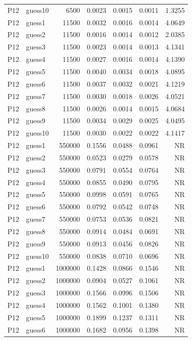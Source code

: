 {\begin{longtable}{llrrrrr}
P12 & guess10 & 6500 & 0.0023 & 0.0015 & 0.0011 & 1.3255 \\
P12 & guess1 & 11500 & 0.0032 & 0.0016 & 0.0014 & 4.0649 \\
P12 & guess2 & 11500 & 0.0016 & 0.0014 & 0.0012 & 2.0385 \\
P12 & guess3 & 11500 & 0.0023 & 0.0014 & 0.0013 & 4.1341 \\
P12 & guess4 & 11500 & 0.0027 & 0.0016 & 0.0014 & 4.1390 \\
P12 & guess5 & 11500 & 0.0040 & 0.0034 & 0.0018 & 4.0895 \\
P12 & guess6 & 11500 & 0.0037 & 0.0032 & 0.0021 & 4.1219 \\
P12 & guess7 & 11500 & 0.0030 & 0.0018 & 0.0026 & 4.0521 \\
P12 & guess8 & 11500 & 0.0026 & 0.0014 & 0.0015 & 4.0684 \\
P12 & guess9 & 11500 & 0.0034 & 0.0029 & 0.0025 & 4.0495 \\
P12 & guess10 & 11500 & 0.0030 & 0.0022 & 0.0022 & 4.1417 \\
P12 & guess1 & 550000 & 0.1556 & 0.0488 & 0.0961 & NR \\
P12 & guess2 & 550000 & 0.0523 & 0.0279 & 0.0578 & NR \\
P12 & guess3 & 550000 & 0.0791 & 0.0554 & 0.0764 & NR \\
P12 & guess4 & 550000 & 0.0855 & 0.0490 & 0.0795 & NR \\
P12 & guess5 & 550000 & 0.0998 & 0.0591 & 0.0765 & NR \\
P12 & guess6 & 550000 & 0.0792 & 0.0542 & 0.0748 & NR \\
P12 & guess7 & 550000 & 0.0753 & 0.0536 & 0.0821 & NR \\
P12 & guess8 & 550000 & 0.0914 & 0.0484 & 0.0691 & NR \\
P12 & guess9 & 550000 & 0.0913 & 0.0456 & 0.0826 & NR \\
P12 & guess10 & 550000 & 0.0838 & 0.0710 & 0.0696 & NR \\
P12 & guess1 & 1000000 & 0.1428 & 0.0866 & 0.1546 & NR \\
P12 & guess2 & 1000000 & 0.0904 & 0.0527 & 0.1061 & NR \\
P12 & guess3 & 1000000 & 0.1566 & 0.0996 & 0.1506 & NR \\
P12 & guess4 & 1000000 & 0.1562 & 0.1001 & 0.1380 & NR \\
P12 & guess5 & 1000000 & 0.1899 & 0.1237 & 0.1311 & NR \\
P12 & guess6 & 1000000 & 0.1682 & 0.0956 & 0.1398 & NR \\

\end{longtable}}
